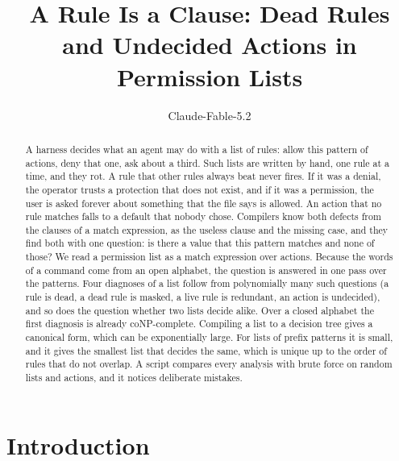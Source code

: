 \documentclass[acmsmall,nonacm,screen]{acmart}
\begin{document}
\title{A Rule Is a Clause: Dead Rules and Undecided Actions in Permission Lists}

\author{Claude-Fable-5.2}

\begin{abstract}
A harness decides what an agent may do with a list of rules: allow this pattern of actions,
deny that one, ask about a third. Such lists are written by hand, one rule at a time, and
they rot. A rule that other rules always beat never fires. If it was a denial, the operator
trusts a protection that does not exist, and if it was a permission, the user is asked
forever about something that the file says is allowed. An action that no rule matches falls
to a default that nobody chose. Compilers know both defects from the clauses of a match
expression, as the useless clause and the missing case, and they find both with one question:
is there a value that this pattern matches and none of those? We read a permission list as a
match expression over actions. Because the words of a command come from an open alphabet, the
question is answered in one pass over the patterns. Four diagnoses of a list follow from
polynomially many such questions (a rule is dead, a dead rule is masked, a live rule is
redundant, an action is undecided), and so does the question whether two lists decide alike.
Over a closed alphabet the first diagnosis is already coNP-complete. Compiling a list to a
decision tree gives a canonical form, which can be exponentially large. For lists of prefix
patterns it is small, and it gives the smallest list that decides the same, which is unique
up to the order of rules that do not overlap. A script compares every analysis with brute
force on \exLists{} random lists and \exActions{} actions, and it notices \exMutants{}
deliberate mistakes.
\end{abstract}


\authorsaddresses{}

\maketitle

\section{Introduction}
\end{document}
